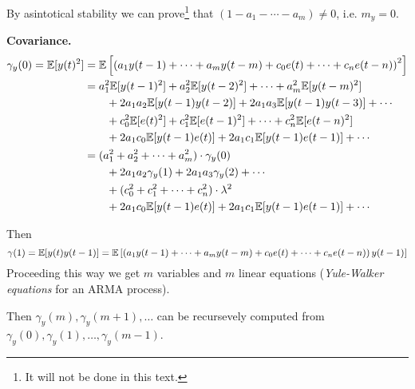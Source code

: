 By asintotical stability we can prove\footnote{It will not be done in this text.} that $(1-a_1-\cdots-a_m)\neq 0$, i.e. $m_{y}=0$.

\textbf{Covariance.}
\begin{align*}
	\gamma_{y}(0) = \mathbb{E}[y(t)^{2}] &= \mathbb{E}\left[\left(a_{1} y(t-1) + \cdots + a_{m} y(t-m) + c_{0} e(t) + \cdots + c_{n} e(t-n)\right)^{2}\right]\\
	&= a_{1}^{2} \mathbb{E}[y(t-1)^{2}] + a_{2}^{2} \mathbb{E}[y(t-2)^{2}] + \cdots+a_{m}^{2} \mathbb{E}[y(t-m)^{2}]\\
	&\qquad + 2 a_{1} a_{2} \mathbb{E}[y(t-1) y(t-2)] + 2 a_{1} a_{3} \mathbb{E}[y(t-1) y(t-3)] + \cdots \\
	&\qquad + c_{0}^{2} \mathbb{E}[e(t)^{2}] + c_{1}^2 \mathbb{E}[e(t-1)^2] + \cdots+c_{n}^2 \mathbb{E}[e(t-n)^2]\\
	&\qquad + 2 a_{1} c_{0} \mathbb{E}[y(t-1) e(t)] + 2 a_{1} c_{1} \mathbb{E}[y(t-1) e(t-1)] + \cdots\\
	&= (a_{1}^{2} + a_{2}^{2} + \cdots+a_{m}^{2})\cdot\gamma_{y}(0)\\
	&\qquad + 2 a_{1} a_{2} \gamma_{y}(1) + 2 a_{1} a_{3} \gamma_{y}(2) + \cdots \\
	&\qquad + (c_{0}^{2} + c_{1}^2 + \cdots+c_{n}^2)\cdot\lambda^2\\
	&\qquad + 2 a_{1} c_{0} \mathbb{E}[y(t-1) e(t)] + 2 a_{1} c_{1} \mathbb{E}[y(t-1) e(t-1)] + \cdots\\
\end{align*}

Then
\[
	\gamma (1)=\mathbb{E}[y(t) y(t-1)] = \mathbb{E}\left[\left(a_{1} y(t-1)+\cdots+a_{m} y(t-m)+c_{0} e(t)+\cdots+c_{n} e(t-n)\right) y(t-1)\right]
\]
Proceeding this way we get $m$ variables and $m$ linear equations (\emph{Yule-Walker equations} for an ARMA process).

Then $\gamma_{y}(m), \gamma_{y}(m+1), \ldots$ can be recursevely computed from $\gamma_{y}(0), \gamma_{y}(1), \ldots, \gamma_{y}(m-1)$.